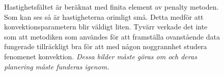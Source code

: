 \begin{figure}[hpbt]
\caption{Hastighetsfältet är beräknat med finita element av penalty metoden.
Som kan ses så är hastigheterna orimligt små. Detta medför att konvektionsparametern
blir väldigt liten. Tyvärr verkade det inte som att metodiken som användes för
att framställa ovanstående data fungerade tillräckligt bra för att med någon noggrannhet studera fenomenet konvektion. \emph{\color{red} Dessa bilder måste göras om och deras planering måste funderas igenom.}}

\end{figure}

